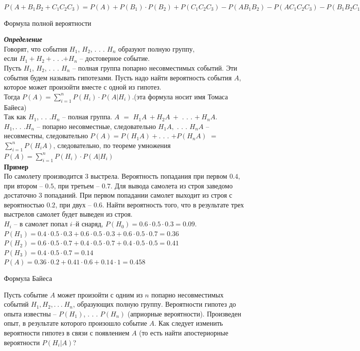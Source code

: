 \documentclass[russian, 12pt, fleqn]{article}
\begin{document}
$P(A+B_1B_2+C_1C_2C_3)=P(A)+P(B_1)\cdot P(B_2)+P(C_1C_2C_3)-P(AB_1B_2)-P(AC_1C_2C_3)-P(B_1B_2C_1C_2C_3)+P(AB_1B_2C_1C_2C_3)$\\
\begin{center}
$\textbf{Формула полной вероятности }$
\end{center}
\textit{\textbf{Определение}}\\Говорят, что события $H_1$, $H_2$, . . . $H_n$ образуют полную группу, \\если $H_1+H_2+$. . .$+H_n$ -- достоверное событие.\\
Пусть $H_1$, $H_2$, . . . $H_n$ -- полная группа попарно несовместимых событий. Эти события будем называть гипотезами. Пусть надо найти вероятность события $A$, которое может произойти вместе с одной из гипотез.\\ Тогда $P(A)=\sum\limits_{i=1}^{n}P(H_i) \cdot P(A|H_i).$(эта формула носит имя Томаса Байеса)\\
Так как $H_1$, . . .$H_n$ -- полная группа. $A$ $=$ $H_1A\ +H_2A\ +$  . . .  $+\ H_nA$.\\
 $H_1,$. . .$H_n$ -- попарно несовместные, следовательно $H_1A,$ . . . $H_nA$ -- несовместны, следовательно $P(A)=P(H_1A) +$. . . $ + P(H_nA)$ $=$ $\sum\limits_{i = 1}^{n} P(H_iA)$, следовательно, по теореме умножения $P(A)=\sum\limits_{i = 1}^{n}P(H_i)\cdot P(A|H_i)$\\
\textbf{Пример\ }\\По самолету производится 3 выстрела. Вероятность попадания при первом $0.4$, при втором -- $0.5$, при третьем -- $0.7$. Для вывода самолета из
 строя заведомо достаточно 3 попаданий. При первом попадании самолет выходит из строя с вероятностью $0.2$, при двух -- $0.6$. Найти вероятность того, что в результате трех выстрелов самолет будет выведен из строя.\\
$H_i$ -- в самолет попал $i$--й снаряд, $P(H_0)=0.6\cdot0.5\cdot0.3=0.09$. \\
$P(H_1)=0.4\cdot0.5\cdot0.3+0.6\cdot0.5\cdot0.3+0.6\cdot0.5\cdot0.7=0.36$\\
$P(H_2)=0.6\cdot0.5\cdot 0.7+0.4\cdot0.5\cdot0.7+0.4\cdot0.5\cdot0.5=0.41$\\
$P(H_3)=0.4\cdot0.5\cdot0.7=0.14$\\
$P(A)=0.36\cdot0.2+0.41\cdot0.6+0.14\cdot1=0.458$\\
\begin{center}
$\textbf{Формула Байеса }$
\end{center}
Пусть событие $A$ может произойти с одним из $n$ попарно несовместимых событий $H_1, H_2, .\ .\ .\ H_n$, образующих полную группу. Вероятности гипотез до опыта известны -- $P(H_1)$, . . . $P(H_n)$ (априорные вероятности). Произведен опыт, в результате которого произошло событие $A$. Как следует изменить вероятности гипотез в связи с появлением $A$ (то есть найти апостериорные вероятности $P(H_i|A)$?
\end{document}

